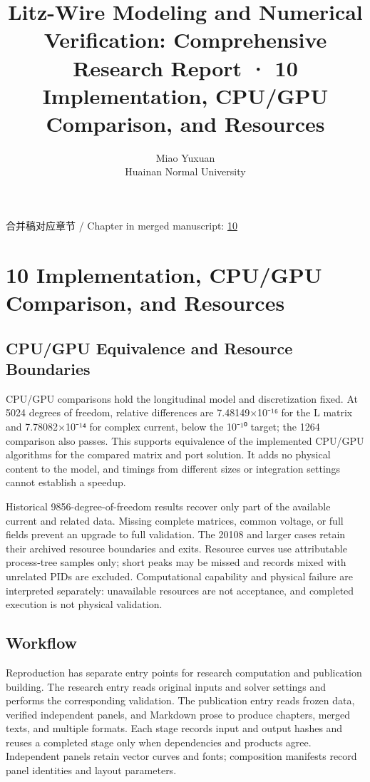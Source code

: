 \documentclass[11pt]{article}
\begin{document}
\title{Litz-Wire Modeling and Numerical Verification: Comprehensive Research Report · 10 Implementation, CPU/GPU Comparison, and Resources}
\author{Miao Yuxuan\\Huainan Normal University}
\date{}
\maketitle
\noindent 合并稿对应章节 / Chapter in merged manuscript: \href{report_en_single.pdf#chapter-10}{10}\par
\FloatBarrier
\section*{10 Implementation, CPU/GPU Comparison, and Resources}
\hypertarget{chapter-10}{}
\subsection*{CPU/GPU Equivalence and Resource Boundaries}
\hypertarget{10.compute.heading}{}
CPU/GPU comparisons hold the longitudinal model and discretization fixed. At 5024 degrees of freedom, relative differences are 7.48149×10⁻¹⁶ for the L matrix and 7.78082×10⁻¹⁴ for complex current, below the 10⁻¹⁰ target; the 1264 comparison also passes. This supports equivalence of the implemented CPU/GPU algorithms for the compared matrix and port solution. It adds no physical content to the model, and timings from different sizes or integration settings cannot establish a speedup.


Historical 9856-degree-of-freedom results recover only part of the available current and related data. Missing complete matrices, common voltage, or full fields prevent an upgrade to full validation. The 20108 and larger cases retain their archived resource boundaries and exits. Resource curves use attributable process-tree samples only; short peaks may be missed and records mixed with unrelated PIDs are excluded. Computational capability and physical failure are interpreted separately: unavailable resources are not acceptance, and completed execution is not physical validation.


\subsection*{Workflow}
\hypertarget{10.workflow.heading}{}
Reproduction has separate entry points for research computation and publication building. The research entry reads original inputs and solver settings and performs the corresponding validation. The publication entry reads frozen data, verified independent panels, and Markdown prose to produce chapters, merged texts, and multiple formats. Each stage records input and output hashes and reuses a completed stage only when dependencies and products agree. Independent panels retain vector curves and fonts; composition manifests record panel identities and layout parameters.
\end{document}
